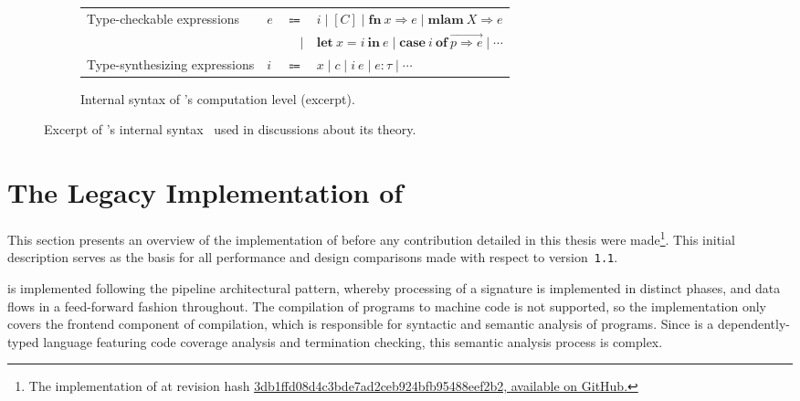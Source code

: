 \begin{figure}
\begin{subfigure}{\linewidth}
\begin{tabular}{p{5.5cm} >{\raggedleft}p{1cm} r l}
Type-checkable expressions & $e$ & $\Coloneqq$ & $i \mid [C] \mid \mathbf{fn}\ x \Rightarrow e \mid \mathbf{mlam}\ X \Rightarrow e$ \\
& & $|$ & $\mathbf{let}\ x = i\ \mathbf{in}\ e \mid \mathbf{case}\ i\ \mathbf{of}\ \overrightarrow{p \Rightarrow e} \mid \cdots$\\
Type-synthesizing expressions & $i$ & $\Coloneqq$ & $x \mid c \mid i \ e \mid e : \tau \mid \cdots$
\end{tabular}
\caption{Internal syntax of \Beluga's computation level (excerpt).}
\end{subfigure}
\caption[Excerpt of \Beluga's internal syntax]{%
Excerpt of \Beluga's internal syntax~\cite{nanevski2008contextual, germain2010implementation, cave2013first, ferreira2013compiling} used in discussions about its theory.
}
\label{figure:internal-syntax}
\end{figure}

\section{The Legacy Implementation of \Beluga} \label{section:beluga-implementation}

This section presents an overview of the implementation of \Beluga before any contribution detailed in this thesis were made\footnote{The implementation of \Beluga at revision hash \href{https://github.com/Beluga-lang/Beluga/tree/3db1ffd08d4c3bde7ad2ceb924bfb95488eef2b2}{3db1ffd08d4c3bde7ad2ceb924bfb95488eef2b2, available on GitHub.}}.
This initial description serves as the basis for all performance and design comparisons made with respect to \Beluga version~\texttt{1.1}.

\Beluga is implemented following the pipeline architectural pattern, whereby processing of a \Beluga signature is implemented in distinct phases, and data flows in a feed-forward fashion throughout.
The compilation of \Beluga programs to machine code is not supported, so the implementation only covers the frontend component of compilation, which is responsible for syntactic and semantic analysis of programs.
Since \Beluga is a dependently-typed language featuring code coverage analysis and termination checking, this semantic analysis process is complex.

